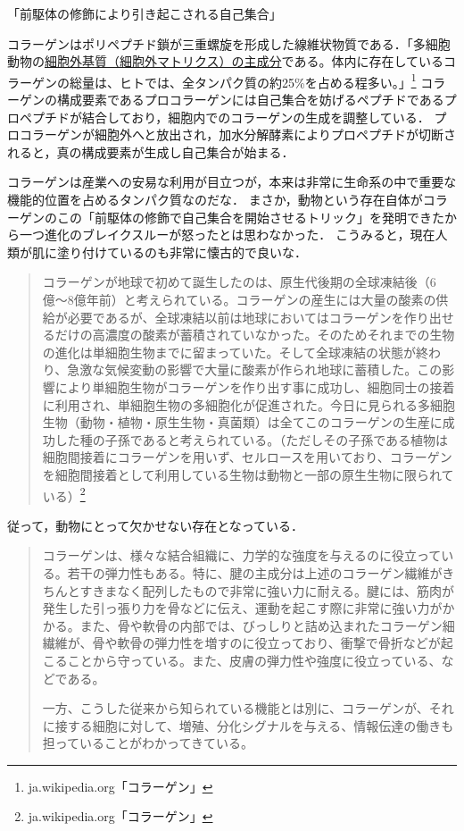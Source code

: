 \documentclass[uplatex, dvipdfmx]{jsreport}
\begin{document}
\begin{definition}
    「前駆体の修飾により引き起こされる自己集合」
\end{definition}
\begin{example}[collagenの生合成]
    コラーゲンはポリペプチド鎖が三重螺旋を形成した線維状物質である．「多細胞動物の\underline{細胞外基質（細胞外マトリクス）の主成分}である。体内に存在しているコラーゲンの総量は、ヒトでは、全タンパク質の約25\%を占める程多い。」\footnote{ja.wikipedia.org「コラーゲン」}
    コラーゲンの構成要素であるプロコラーゲンには自己集合を妨げるペプチドであるプロペプチドが結合しており，細胞内でのコラーゲンの生成を調整している．
    プロコラーゲンが細胞外へと放出され，加水分解酵素によりプロペプチドが切断されると，真の構成要素が生成し自己集合が始まる．

    コラーゲンは産業への安易な利用が目立つが，本来は非常に生命系の中で重要な機能的位置を占めるタンパク質なのだな．
    まさか，動物という存在自体がコラーゲンのこの「前駆体の修飾で自己集合を開始させるトリック」を発明できたから一つ進化のブレイクスルーが怒ったとは思わなかった．
    こうみると，現在人類が肌に塗り付けているのも非常に懐古的で良いな．
    \begin{quote}
        コラーゲンが地球で初めて誕生したのは、原生代後期の全球凍結後（6億〜8億年前）と考えられている。コラーゲンの産生には大量の酸素の供給が必要であるが、全球凍結以前は地球においてはコラーゲンを作り出せるだけの高濃度の酸素が蓄積されていなかった。そのためそれまでの生物の進化は単細胞生物までに留まっていた。そして全球凍結の状態が終わり、急激な気候変動の影響で大量に酸素が作られ地球に蓄積した。この影響により単細胞生物がコラーゲンを作り出す事に成功し、細胞同士の接着に利用され、単細胞生物の多細胞化が促進された。今日に見られる多細胞生物（動物・植物・原生生物・真菌類）は全てこのコラーゲンの生産に成功した種の子孫であると考えられている。（ただしその子孫である植物は細胞間接着にコラーゲンを用いず、セルロースを用いており、コラーゲンを細胞間接着として利用している生物は動物と一部の原生生物に限られている）\footnote{ja.wikipedia.org「コラーゲン」}
    \end{quote}
    従って，動物にとって欠かせない存在となっている．
    \begin{quotation}
        コラーゲンは、様々な結合組織に、力学的な強度を与えるのに役立っている。若干の弾力性もある。特に、腱の主成分は上述のコラーゲン繊維がきちんとすきまなく配列したもので非常に強い力に耐える。腱には、筋肉が発生した引っ張り力を骨などに伝え、運動を起こす際に非常に強い力がかかる。また、骨や軟骨の内部では、びっしりと詰め込まれたコラーゲン細繊維が、骨や軟骨の弾力性を増すのに役立っており、衝撃で骨折などが起こることから守っている。また、皮膚の弾力性や強度に役立っている、などである。

        一方、こうした従来から知られている機能とは別に、コラーゲンが、それに接する細胞に対して、増殖、分化シグナルを与える、情報伝達の働きも担っていることがわかってきている。
    \end{quotation}
\end{example}
\end{document}
